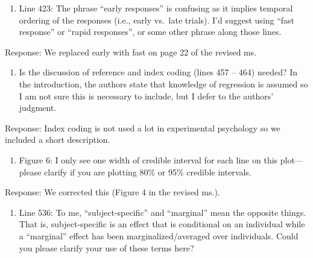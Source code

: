 \documentclass[
]{article}
\providecommand{\tightlist}{%
  \setlength{\itemsep}{0pt}\setlength{\parskip}{0pt}}
\renewenvironment{quote}{\begin{leftbar}}{\end{leftbar}}
\begin{document}
\begin{quote}
\begin{enumerate}
\def\labelenumi{\arabic{enumi}.}
\setcounter{enumi}{9}
\tightlist
\item
  Line 423: The phrase ``early responses'' is confusing as it implies
  temporal ordering of the responses (i.e., early vs.~late trials). I'd
  suggest using ``fast response'' or ``rapid responses'', or some other
  phrase along those lines.
\end{enumerate}
\end{quote}

Response: We replaced early with fast on page 22 of the revised ms.

\begin{quote}
\begin{enumerate}
\def\labelenumi{\arabic{enumi}.}
\setcounter{enumi}{10}
\tightlist
\item
  Is the discussion of reference and index coding (lines 457 -- 464)
  needed? In the introduction, the authors state that knowledge of
  regression is assumed so I am not sure this is necessary to include,
  but I defer to the authors' judgment.
\end{enumerate}
\end{quote}

Response: Index coding is not used a lot in experimental psychology so
we included a short description.

\begin{quote}
\begin{enumerate}
\def\labelenumi{\arabic{enumi}.}
\setcounter{enumi}{11}
\tightlist
\item
  Figure 6: I only see one width of credible interval for each line on
  this plot--- please clarify if you are plotting 80\% or 95\% credible
  intervals.
\end{enumerate}
\end{quote}

Response: We corrected this (Figure 4 in the revised ms.).

\begin{quote}
\begin{enumerate}
\def\labelenumi{\arabic{enumi}.}
\setcounter{enumi}{12}
\tightlist
\item
  Line 536: To me, ``subject-specific'' and ``marginal'' mean the
  opposite things. That is, subject-specific is an effect that is
  conditional on an individual while a ``marginal'' effect has been
  marginalized/averaged over individuals. Could you please clarify your
  use of these terms here?
\end{enumerate}
\end{quote}
\end{document}
